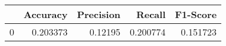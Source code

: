 \begin{tabular}{lrrrr}
\toprule
{} &  Accuracy &  Precision &    Recall &  F1-Score \\
\midrule
0 &  0.203373 &    0.12195 &  0.200774 &  0.151723 \\
\bottomrule
\end{tabular}
